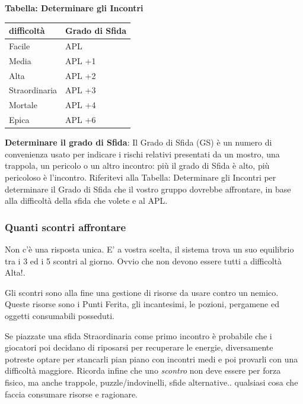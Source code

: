 \begin{multicols}{2}
\medskip

\textbf{Tabella: Determinare gli Incontri}

\medskip

\begin{tabular}{@{}ll@{}} %
\textbf{difficoltà} & \textbf{Grado di Sfida}\\
\toprule
Facile& APL\\
Media& APL +1\\
Alta& APL +2\\
Straordinaria& APL +3\\
Mortale& APL +4\\
Epica& APL +6
\end{tabular}

\medskip

%

\textbf{Determinare il grado di Sfida}: Il Grado di Sfida (GS) è un numero di convenienza usato per indicare i rischi relativi presentati da un mostro, una trappola, un pericolo o un altro incontro: più il grado di Sfida è alto, più pericoloso è l'incontro. Riferitevi alla Tabella: Determinare gli Incontri per determinare il Grado di Sfida che il vostro gruppo dovrebbe affrontare, in base alla difficoltà della sfida che volete e al APL.

\subsubsection{Quanti scontri affrontare}\label{quantiincontri}

Non c'è una risposta unica. E' a vostra scelta, il sistema trova un suo equilibrio tra i 3 ed i 5 scontri al giorno. Ovvio che non devono essere tutti a difficoltà Alta!.

Gli scontri sono alla fine una gestione di risorse da usare contro un nemico. Queste risorse sono i Punti Ferita, gli incantesimi, le pozioni, pergamene ed oggetti consumabili posseduti.

Se piazzate una sfida Straordinaria come primo incontro è probabile che i giocatori poi decidano di riposarsi per recuperare le energie, diversamente potreste optare per stancarli pian piano con incontri medi e poi provarli con una difficoltà maggiore. Ricorda infine che uno \emph{scontro} non deve essere per forza fisico, ma anche trappole, puzzle/indovinelli, sfide alternative.. qualsiasi cosa che faccia consumare risorse e ragionare.


\end{multicols}
